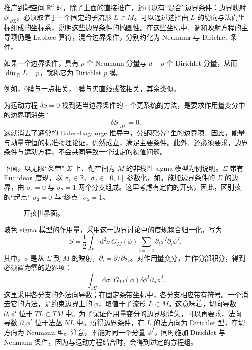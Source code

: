 推广到靶空间 $\mathbb{R}^d$ 时，除了上面的直接推广，还可以有“混合”边界条件：边界映射 $\phi|_{\partial\Sigma}$，必须取值于一个固定的子流形 $L\subset M$。可以通过选择由 $L$ 的切向与法向坐标组成的坐标系，说明这些边界条件的椭圆性。在这些坐标中，调和映射方程的主导项仍是 Laplace 算符，混合边界条件，分别约化为 Neumann 与 Dirichlet 条件。

\begin{definition*}\label{def:3.dirichlet-p-brane}
如果一个边界条件，具有 $p$ 个 Neumann 分量与 $d-p$ 个 Dirichlet 分量，从而 $\dim_{\mathbb{R}}L=p$，就称它为 Dirichlet $p$ 膜。
\end{definition*}
例如，0膜与一点相关，1膜与实直线或弦相关，其余类似。

为运动方程 $\delta S=0$ 找到适当边界条件的一个更系统的方法，是要求作用量变分中的边界项消失：
\[
\delta S\big|_{\partial\Sigma}=0.
\]
这就消去了通常的 Euler--Lagrange 推导中，分部积分产生的边界项。因此，能量与动量守恒的标准物理论证，仍然成立，满足主要条件。此外，还必须要求，边界条件与运动方程，不会共同导致一个过定的初值问题。

下面，以无限“条带” $\Sigma$ 上、靶空间为 $M$ 的非线性 sigma 模型为例说明。$\Sigma$ 带有 Euclidean 度规，以 $\sigma_1\in\mathbb{R}$、$\sigma_2\in[0,1]$ 参数化，如。施加边界条件的 $\Sigma$ 的边界，由 $\sigma_2=0$ 与 $\sigma_2=1$ 两个分支组成。这里考虑有定向的开弦，因此，区别弦的“起点” $\sigma_2=0$ 与“终点” $\sigma_2=1$。
\begin{figure}[H]
\centering
{}
\caption{开弦世界面。}\label{fig:3.4}
\end{figure}

玻色 sigma 模型的作用量，采用这一边界讨论中的度规耦合归一化，写为
\[
S=\frac12\int_\Sigma\mathrm{d}^2\sigma\,
G_{IJ}(\phi)\sum_{i=1,2}\partial_i\phi^I\partial_i\phi^J,
\]
其中，$\phi$ 是从 $\Sigma$ 到 $M$ 的映射，$\partial_i=\partial/\partial\sigma_i$。对作用量变分，并作分部积分，得到必须置为零的边界项：
\[
\int_{\partial\Sigma}\mathrm{d}\sigma_1\,
G_{IJ}(\phi)\delta\phi^I\partial_n\phi^J.
\]
这里采用各分支的外法向导数；在固定条带坐标中，各分支相应带有符号。一个消去它的方法，是约束边界上的 $\phi$，取值于子流形 $L\subset M$。这意味着，切向导数 $\partial_1\phi^I$ 位于 $TL\subset TM$ 中。为了保证作用量变分的边界项消失，可以再要求，法向导数 $\partial_2\phi^I$ 位于法丛 $NL$ 中。所得边界条件，在 $L$ 的法方向为 Dirichlet 型，在切方向为 Neumann 型。注意，不能对同一个分量 $\phi^I$，同时施加 Dirichlet 与 Neumann 条件，因为与运动方程结合时，会得到过定的方程组。

